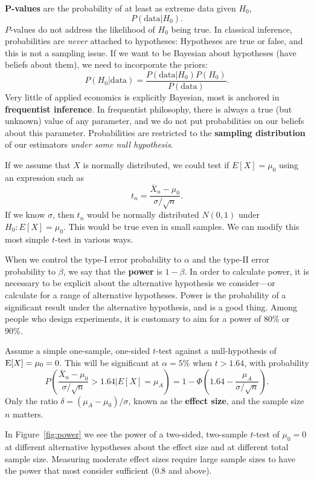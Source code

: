 \documentclass[10pt]{article}
\begin{document}
\textbf{P-values} are the probability of at least as extreme data given $H_0$,
\[ P( \text{data}| H_0).\]
$P$-values do not address the likelihood of $H_0$ being true.
In classical inference, probabilities are \emph{never} attached to hypotheses: Hypotheses are true 
or false, and this is not a sampling issue.
If we want to be Bayesian about hypotheses (have beliefs about them), we need to incorporate the priors: 
\[ P(H_0|\text{data}) = \frac{ P(\text{data}|H_0) P(H_0)}{ P(\text{data}) }. \]
Very little of applied economics is explicitly Bayesian, most is anchored in
\textbf{frequentist inference}. In frequentist philosophy, there is always a
true (but unknown) value of any parameter, and we do not put probabilities on
our beliefs about this parameter. Probabilities are restricted to the
\textbf{sampling distribution} of our estimators \emph{under some null
hypothesis}.

If we assume that $X$ is normally distributed, we could 
test if $E[X] = \mu_0$ using an expression such as
\[
t_n = \frac{\overline{X}_n - \mu_0}{\sigma/\sqrt{n}}.
\]
If we know $\sigma$, then $t_n$ would be normally distributed $N(0,1)$ under $H_0\!: E[X]=\mu_0$. 
This would be true even in small samples.
We can modify this most simple $t$-test in various ways.


When we control the type-I error probability to $\alpha$ and the type-II error probability
to $\beta$, we say that the \textbf{power} is $1-\beta$. 
In order to calculate power, it is necessary to be explicit about the alternative hypothesis 
we consider---or calculate for a range of alternative hypotheses. 
Power is the probability of a significant result under the alternative hypothesis, and is a good thing. 
Among people who design experiments, it is customary to aim for a power of 80\% or 90\%.

Assume a simple one-sample, one-sided $t$-test against a null-hypothesis of $\operatorname{E}[X]=\mu_0=0$. This will
be significant at $\alpha=5\%$ when $t> 1.64$, with probability
\[
P\left( \frac{\overline{X}_n - \mu_0}{\sigma/\sqrt{n}} > 1.64 | E[X]=\mu_A\right) = 
1 - \Phi\left( 1.64 - \frac{\mu_A}{\sigma/\sqrt{n}}\right).
\]
Only the ratio $\delta=(\mu_A-\mu_0)/\sigma$, known as the \textbf{effect size}, and the sample
size $n$ matters.

In Figure~\ref{fig:power} we see the power of a two-sided, two-sample $t$-test
of $\mu_0=0$ at different alternative hypotheses about the effect size and at
different total sample size. Measuring moderate effect sizes require large sample
sizes to have the power that most consider sufficient (0.8 and above). 
\end{document}
